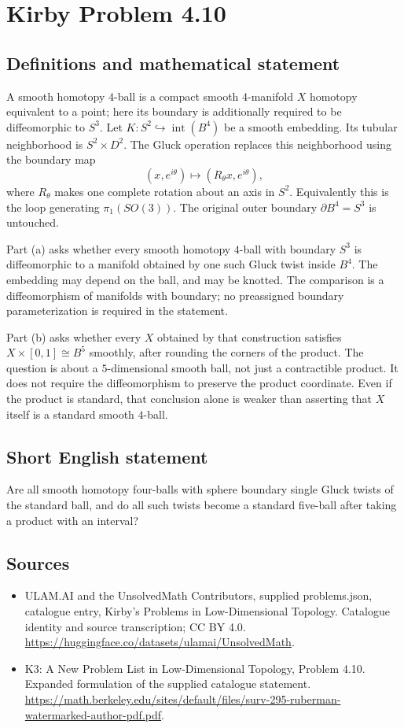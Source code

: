 \documentclass[11pt,a4paper]{article}
\begin{document}
\section*{Kirby Problem 4.10}\label{statement}

\subsection{Definitions and mathematical statement}
A smooth homotopy $4$-ball is a compact smooth $4$-manifold $X$
homotopy equivalent to a point; here its boundary is additionally
required to be diffeomorphic to $S^3$. Let $K:S^2\hookrightarrow
\operatorname{int}(B^4)$ be a smooth embedding. Its tubular neighborhood
is $S^2\times D^2$. The Gluck operation replaces this neighborhood
using the boundary map
\[
 (x,e^{i\theta})\longmapsto(R_\theta x,e^{i\theta}),
\]
where $R_\theta$ makes one complete rotation about an axis in $S^2$.
Equivalently this is the loop generating $\pi_1(SO(3))$.
The original outer boundary $\partial B^4=S^3$ is untouched.

Part (a) asks whether every smooth homotopy $4$-ball with boundary
$S^3$ is diffeomorphic to a manifold obtained by one such Gluck twist
inside $B^4$. The embedding may depend on the ball, and may be
knotted. The comparison is a diffeomorphism of manifolds with boundary;
no preassigned boundary parameterization is required in the statement.

Part (b) asks whether every $X$ obtained by that construction satisfies
$X\times[0,1]\cong B^5$ smoothly, after rounding the corners of the
product. The question is about a $5$-dimensional smooth ball, not just
a contractible product. It does not require the diffeomorphism to
preserve the product coordinate. Even if the product is standard,
that conclusion alone is weaker than asserting that $X$ itself is a
standard smooth $4$-ball.
\subsection{Short English statement}
Are all smooth homotopy four-balls with sphere boundary single Gluck twists of the standard ball, and do all such twists become a standard five-ball after taking a product with an interval?
\subsection{Sources}
\begin{itemize}
\item[S1] ULAM.AI and the UnsolvedMath Contributors, supplied problems.json, catalogue entry, Kirby's Problems in Low-Dimensional Topology. Catalogue identity and source transcription; CC BY 4.0.
\url{https://huggingface.co/datasets/ulamai/UnsolvedMath}.
\item[S2] K3: A New Problem List in Low-Dimensional Topology, Problem 4.10. Expanded formulation of the supplied catalogue statement.
\url{https://math.berkeley.edu/sites/default/files/surv-295-ruberman-watermarked-author-pdf.pdf}.
\end{itemize}
\end{document}
